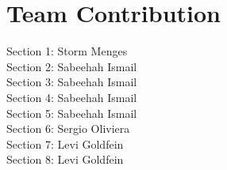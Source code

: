 \documentclass[12pt]{article}
\begin{document}
\section{Team Contribution}
Section 1: Storm Menges\\
Section 2: Sabeehah Ismail\\
Section 3: Sabeehah Ismail\\
Section 4: Sabeehah Ismail\\
Section 5: Sabeehah Ismail\\
Section 6: Sergio Oliviera\\
Section 7: Levi Goldfein\\
Section 8: Levi Goldfein\\



 
 
\end{document}
